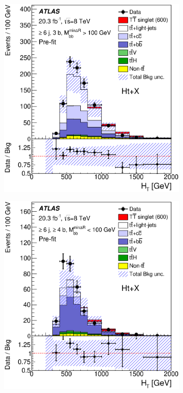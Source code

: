 \begin{figure}[!tp]
\begin{center}
\begin{subfigure}{0.49\textwidth}
\includegraphics[width=\textwidth]{Analysis/Figures_HtX/HtXPaper/HtX/prefit_unblind/HTAll_6jetin3btagexInHmv18TeV.eps}
\caption{}\end{subfigure}
  \begin{subfigure}{0.49\textwidth}
\includegraphics[width=\textwidth]{Analysis/Figures_HtX/HtXPaper/HtX/prefit_unblind/HTAll_6jetin4btaginOutHmv18TeV.eps}

\end{subfigure}
\end{center}
\end{figure}

